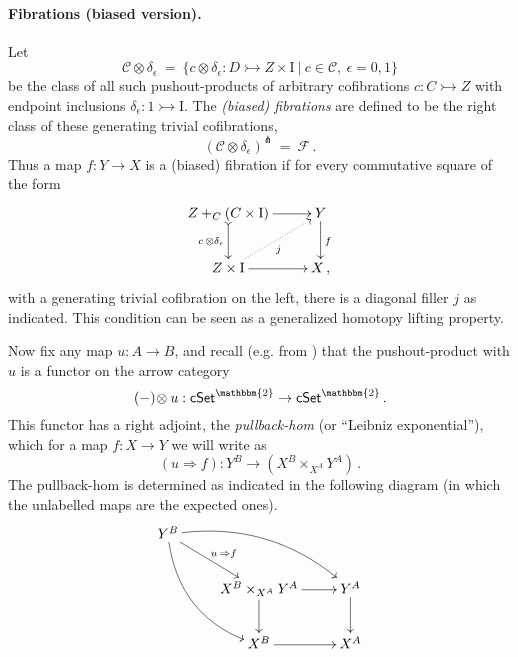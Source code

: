 \documentclass[11pt]{article}
\newcommand{\cSet}{\ensuremath{\mathsf{cSet}}}
\newcommand{\mono}{\ensuremath{\rightarrowtail}}
\newcommand{\I}{\ensuremath{\mathrm{I}}}
\newtheorem{proposition}[theorem]{Proposition}
\theoremstyle{remark}
\theoremstyle{definition}
\begin{document}
\paragraph{Fibrations (biased version).}
Let 
\[
\mathcal{C}\otimes \delta_\epsilon\ =\ \{ c \otimes \delta_\epsilon : D \mono Z \times \I\ |\ c \in\mathcal{C},\ \epsilon = 0,1 \}
\]
be the class of all such pushout-products of arbitrary cofibrations $c : C \mono Z$ with endpoint inclusions $\delta_\epsilon : 1 \mono \I$.
The \emph{(biased) fibrations} are defined to be the right class of these generating trivial cofibrations,
\[
(\mathcal{C}\otimes \delta_\epsilon)^\pitchfork\ =\ \mathcal{F}\,.
\]
Thus a map $f : Y\to X$ is a (biased) fibration if for every commutative square of the form
\begin{equation}\label{diagram:biasedfillers}
\xymatrix{
Z +_C (C\times\I) \ar@{>->}[d]_{c\, \otimes \delta_\epsilon} \ar[r] & Y \ar[d]^f \\
Z\times \I \ar@{.>}[ru]_{j} \ar[r] & X\,,
}
\end{equation}
with a generating trivial cofibration on the left, there is a diagonal filler $j$ as indicated. This condition can be seen as a generalized homotopy lifting property.

Now fix any map $u : A \to B$, and recall (e.g. from \cite{R}) that the pushout-product with $u$ is a functor on the arrow category 
\[
(-)\!\otimes u : \cSet^\mathbbm{2} \to\cSet^\mathbbm{2}\,.
\]
This functor has a right adjoint, the \emph{pullback-hom} (or ``Leibniz exponential''), which for a map $f : X\to Y$ we will write as
\[
(u \Rightarrow\! f) : Y^B \to (X^B \times_{X^A} Y^A) \,.
\]
The pullback-hom is determined as indicated in the following diagram (in which the unlabelled maps are the expected ones).
\begin{equation}\label{diagram:pullbackhom}
\xymatrix{
Y^B \ar@/_4ex/ [rdd] \ar[rd]^{u\, \Rightarrow f} \ar@/^4ex/ [rrd] && \\
& X^B \times_{X^A} Y^A \ar[d] \ar[r] & Y^A \ar[d] \\
& X^B \ar[r] &  X^A 
}
\end{equation}
\end{document}
